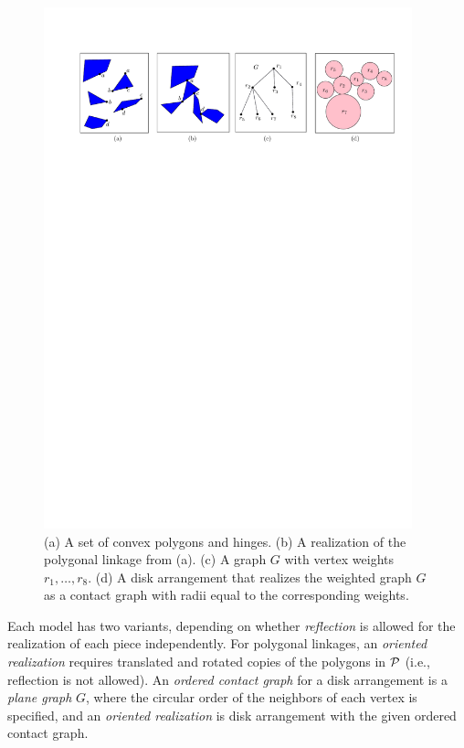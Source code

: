 \begin{figure}[htbp]
  \centering
 \includegraphics[width=0.95\textwidth]{graphics/fig1}
\caption{\small (a) A set of convex polygons and hinges. (b) A realization of the polygonal linkage from (a).
(c) A graph $G$ with vertex weights $r_1,\ldots, r_8$. (d) A disk arrangement that realizes the 
weighted graph $G$ as a contact graph with radii equal to the corresponding weights.}
  \label{fig:1}
\end{figure}
Each model has two variants, depending on whether \emph{reflection} is allowed for the realization of each piece independently. For polygonal linkages, an \emph{oriented realization} requires translated and rotated copies of the polygons in ${\cal P}$ (i.e., reflection is not allowed). An \emph{ordered contact graph} for a disk arrangement is a \emph{plane graph} $G$, where the circular order of the neighbors of each vertex is specified, and an \emph{oriented realization} is disk arrangement with the given ordered contact graph.

